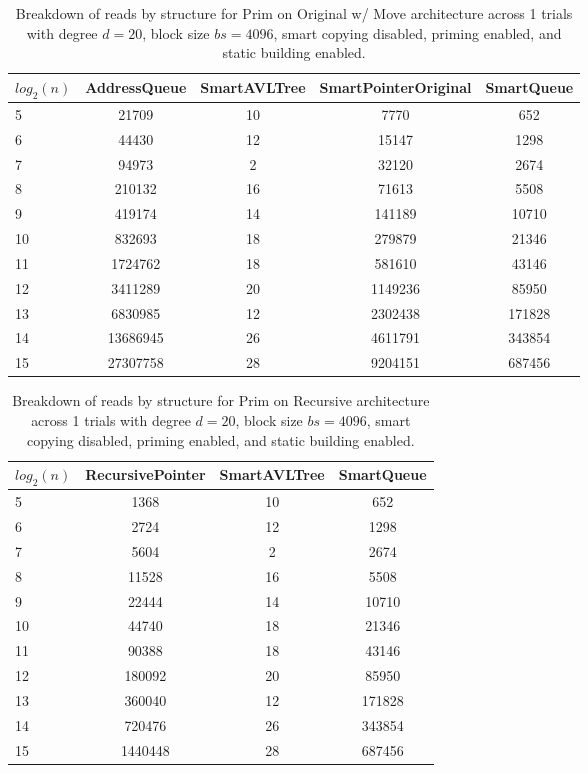 \begin{table}[]
\centering
\begin{tabular}{|l|c|c|c|c|}
$log_2(n)$ & AddressQueue & SmartAVLTree & SmartPointerOriginal & SmartQueue \\ \hline
5 & 21709 & 10 & 7770 & 652 \\ \hline
6 & 44430 & 12 & 15147 & 1298 \\ \hline
7 & 94973 & 2 & 32120 & 2674 \\ \hline
8 & 210132 & 16 & 71613 & 5508 \\ \hline
9 & 419174 & 14 & 141189 & 10710 \\ \hline
10 & 832693 & 18 & 279879 & 21346 \\ \hline
11 & 1724762 & 18 & 581610 & 43146 \\ \hline
12 & 3411289 & 20 & 1149236 & 85950 \\ \hline
13 & 6830985 & 12 & 2302438 & 171828 \\ \hline
14 & 13686945 & 26 & 4611791 & 343854 \\ \hline
15 & 27307758 & 28 & 9204151 & 687456 \\ \hline
\end{tabular}
\caption{Breakdown of reads by structure for Prim on Original w/ Move architecture across 1 trials with degree $d=20$, block size $bs=4096$, smart copying disabled, priming enabled, and static building enabled.}
    \label{tab:reads_by_structure_prim_d20_bs4096_trials1_copiesfalse_primetrue_staticinsertiontrue_ptoriginal_movetrue}
\end{table}

\begin{table}[]
\centering
\begin{tabular}{|l|c|c|c|}
$log_2(n)$ & RecursivePointer & SmartAVLTree & SmartQueue \\ \hline
5 & 1368 & 10 & 652 \\ \hline
6 & 2724 & 12 & 1298 \\ \hline
7 & 5604 & 2 & 2674 \\ \hline
8 & 11528 & 16 & 5508 \\ \hline
9 & 22444 & 14 & 10710 \\ \hline
10 & 44740 & 18 & 21346 \\ \hline
11 & 90388 & 18 & 43146 \\ \hline
12 & 180092 & 20 & 85950 \\ \hline
13 & 360040 & 12 & 171828 \\ \hline
14 & 720476 & 26 & 343854 \\ \hline
15 & 1440448 & 28 & 687456 \\ \hline
\end{tabular}
\caption{Breakdown of reads by structure for Prim on Recursive architecture across 1 trials with degree $d=20$, block size $bs=4096$, smart copying disabled, priming enabled, and static building enabled.}
    \label{tab:reads_by_structure_prim_d20_bs4096_trials1_copiesfalse_primetrue_staticinsertiontrue_ptrecursive_movetrue}
\end{table}

